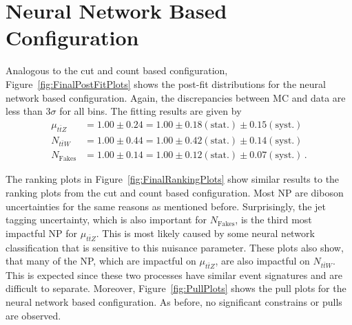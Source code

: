 \documentclass[bachelor,oneside, BCOR10mm,
			ngerman,english  %
]{GAUBM}
\begin{document}
\section*{Neural Network Based Configuration}
\label{sec:FinalConfigurationResults}
Analogous to the cut and count based configuration, Figure~\ref{fig:FinalPostFitPlots} shows the post-fit distributions for the neural network based configuration. Again, the discrepancies between MC and data are less than $3\sigma$ for all bins. The fitting results are given by 
\begin{align}
	\mu_{t\bar{t}Z} &= 1.00\pm0.24 = 1.00\pm0.18(\text{stat.})\pm0.15(\text{syst.})\\
	N_{t\bar{t}W} 	&= 1.00\pm0.44 = 1.00\pm0.42(\text{stat.})\pm0.14(\text{syst.})\\
	N_\text{Fakes} 	&= 1.00\pm0.14 = 1.00\pm0.12(\text{stat.})\pm0.07(\text{syst.})\,.
\end{align}

The ranking plots in Figure~\ref{fig:FinalRankingPlots} show similar results to the ranking plots from the cut and count based configuration. Most NP are diboson uncertainties for the same reasons as mentioned before. Surprisingly, the jet tagging uncertainty, which is also important for $N_\text{Fakes}$, is the third most impactful NP for $\mu_{t\bar{t}Z}$. This is most likely caused by some neural network classification that is sensitive to this nuisance parameter. These plots also show, that many of the NP, which are impactful on $\mu_{t\bar{t}Z}$, are also impactful on $N_{t\bar{t}W}$. This is expected since these two processes have similar event signatures and are difficult to separate. Moreover, Figure~\ref{fig:PullPlots} shows the pull plots for the neural network based configuration. As before, no significant constrains or pulls are observed.
\end{document}
